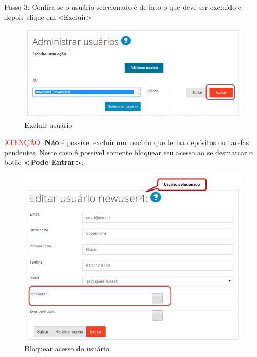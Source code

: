 \documentclass[12pt,hidelinks]{article}
\begin{document}
\newpage

    Passo 3: Confira se o usuário selecionado é de fato o que deve ser excluído e depois clique em <Excluir>
    
    \begin{figure}[!htp]
                \centering
                \includegraphics[scale=0.8]{figura/Figura57.png}
                \caption{Excluir usuário}
            \label{Rotulo}
        \end{figure}
    
    \textcolor{red}{ATENÇÃO}: \textbf{Não} é possível excluir um usuário que tenha depósitos ou tarefas pendentes. Neste caso é possível somente bloquear seu acesso ao se desmarcar o botão \textbf{<Pode Entrar>}.
    
    \begin{figure}[!htp]
                \centering
                \includegraphics[scale=0.8]{figura/Figura58.png}
                \caption{Bloquear acesso do usuário}
            \label{Rotulo}
        \end{figure}
\end{document}
